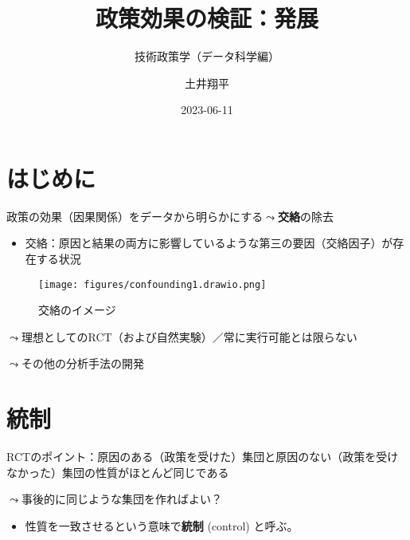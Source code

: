 \documentclass[
  xelatex,
  ja=standard]{bxjsarticle}
\title{政策効果の検証：発展}
\subtitle{技術政策学（データ科学編）}
\author{土井翔平}
\date{2023-06-11}
\providecommand{\tightlist}{%
  \setlength{\itemsep}{0pt}\setlength{\parskip}{0pt}}\usepackage{longtable,booktabs,array}
\begin{document}
\maketitle
\ifdefined\Shaded\renewenvironment{Shaded}{\begin{tcolorbox}[boxrule=0pt, sharp corners, interior hidden, borderline west={3pt}{0pt}{shadecolor}, enhanced, breakable, frame hidden]}{\end{tcolorbox}}\fi

\hypertarget{ux306fux3058ux3081ux306b}{%
\section*{はじめに}\label{ux306fux3058ux3081ux306b}}

政策の効果（因果関係）をデータから明らかにする\(\leadsto\)\textbf{交絡}の除去

\begin{itemize}
\tightlist
\item
  交絡：原因と結果の両方に影響しているような第三の要因（交絡因子）が存在する状況
\end{itemize}

\begin{figure}[htpb]

{\centering \texttt{[image: figures/confounding1.drawio.png]}

}

\caption{交絡のイメージ}

\end{figure}

\(\leadsto\)理想としてのRCT（および自然実験）／常に実行可能とは限らない

\(\leadsto\)その他の分析手法の開発

\hypertarget{ux7d71ux5236}{%
\section{統制}\label{ux7d71ux5236}}

RCTのポイント：原因のある（政策を受けた）集団と原因のない（政策を受けなかった）集団の性質がほとんど同じである

\(\leadsto\)事後的に同じような集団を作ればよい？

\begin{itemize}
\tightlist
\item
  性質を一致させるという意味で\textbf{統制} (control) と呼ぶ。
\end{itemize}
\end{document}
